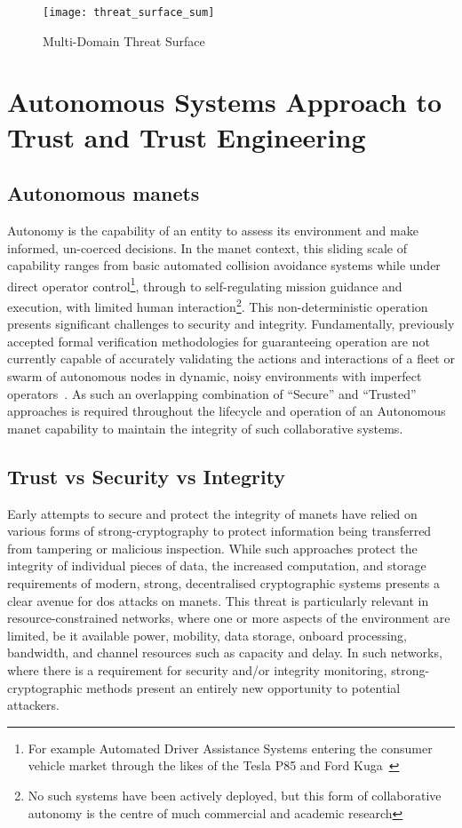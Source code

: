 \begin{figure}[h!]
	\centering
	\texttt{[image: threat\_surface\_sum]}
	\caption[Multi-Domain Threat Surface]{Multi-Domain Threat Surface}
	\label{fig:threat_surface}
\end{figure}


\section{Autonomous Systems Approach to Trust and Trust Engineering}

\subsection{Autonomous \glspl{manet}}
Autonomy is the capability of an entity to assess its environment and make informed, un-coerced decisions.
In the \gls{manet} context, this sliding scale of capability ranges from basic automated collision avoidance systems while under direct operator control\footnote{For example Automated Driver Assistance Systems entering the consumer vehicle market through the likes of the Tesla P85 and Ford Kuga~\cite{Sawade2016}}, through to self-regulating mission guidance and execution, with limited human interaction\footnote{No such systems have been actively deployed, but this form of collaborative autonomy is the centre of much commercial and academic research\cite{Rajesh2015,Autefage2015,Teke2015}}.
This non-deterministic operation presents significant challenges to security and integrity.
Fundamentally, previously accepted formal verification methodologies for guaranteeing operation are not currently capable of accurately validating the actions and interactions of a fleet or swarm of autonomous nodes in dynamic, noisy environments with imperfect operators~\cite{Teke2015}. 
As such an overlapping combination of ``Secure'' and ``Trusted'' approaches is required throughout the lifecycle and operation of an Autonomous \gls{manet} capability to maintain the integrity of such collaborative systems.

\subsection{Trust vs Security vs Integrity}

Early attempts to secure and protect the integrity of \glspl{manet} have relied on various forms of strong-cryptography to protect information being transferred from tampering or malicious inspection.
While such approaches protect the integrity of individual pieces of data, the increased computation, and storage requirements of modern, strong, decentralised cryptographic systems presents a clear avenue for \gls{dos} attacks on \glspl{manet}.
This threat is particularly relevant in resource-constrained networks, where one or more aspects of the environment are limited, be it available power, mobility, data storage, onboard processing, bandwidth, and channel resources such as capacity and delay.
In such networks, where there is a requirement for security and/or integrity monitoring, strong-cryptographic methods present an entirely new opportunity to potential attackers.

